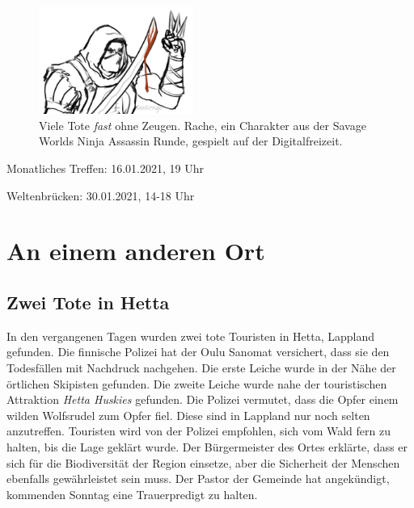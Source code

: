 \documentclass[final]{multiversum}
\begin{document}
\begin{figure}[h]
  \includegraphics[width=0.45\textwidth]{src/img/ninja_assassin_rache_for_multiversum.jpg}\\
  Viele Tote \emph{fast} ohne Zeugen.
  Rache, ein Charakter aus der Savage Worlds Ninja Assassin Runde, gespielt auf der Digitalfreizeit.
\end{figure}
\vspace{-1 \baselineskip}

\begin{termine}
\item Monatliches Treffen: 16.01.2021, 19 Uhr
\item Weltenbrücken: 30.01.2021, 14-18 Uhr
\end{termine}

\section{An einem anderen Ort}

\subsection{Zwei Tote in Hetta}
In den vergangenen Tagen wurden zwei tote Touristen in Hetta, Lappland gefunden. 
Die finnische Polizei hat der Oulu Sanomat versichert, dass sie den Todesfällen mit Nachdruck nachgehen. 
Die erste Leiche wurde in der Nähe der örtlichen Skipisten gefunden. 
Die zweite Leiche wurde nahe der touristischen Attraktion \textit{Hetta Huskies} gefunden.
Die Polizei vermutet, dass die Opfer einem wilden Wolfsrudel zum Opfer fiel. 
Diese sind in Lappland nur noch selten anzutreffen. 
Touristen wird von der Polizei empfohlen, sich vom Wald fern zu halten, bis die Lage geklärt wurde. 
Der Bürgermeister des Ortes erklärte, dass er sich für die Biodiversität der Region einsetze, aber die Sicherheit der Menschen ebenfalls gewährleistet sein muss. 
Der Pastor der Gemeinde hat angekündigt, kommenden Sonntag eine Trauerpredigt zu halten.
\end{document}
